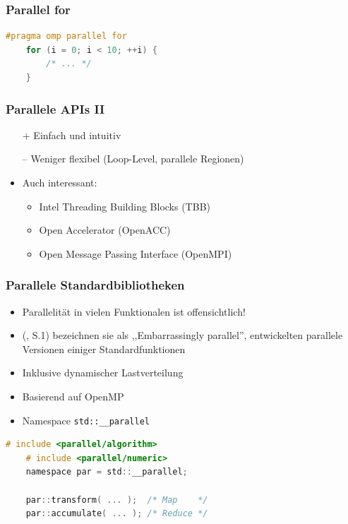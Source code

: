 \documentclass[presentation, shownotes]{beamer}
\begin{document}
\begin{frame}[fragile]
    \frametitle{Parallel for}
    \begin{lstlisting}[language=c,otherkeywords={pragma,for,parallel,omp}]
    #pragma omp parallel for
    for (i = 0; i < 10; ++i) {
        /* ... */
    }
    \end{lstlisting}
\end{frame}

\begin{frame}
\frametitle{Parallele APIs II}
    \begin{itemize}
        \item[+] Einfach und intuitiv
        \item[--] Weniger flexibel (Loop-Level, parallele Regionen)
        \bigskip
        \item Auch interessant:
            \begin{itemize}
            \item Intel Threading Building Blocks (TBB)
            \item Open Accelerator (OpenACC)
            \item Open Message Passing Interface (OpenMPI)
            \end{itemize}
    \end{itemize}
\end{frame}

\begin{frame}
\frametitle{Parallele Standardbibliotheken}
    \begin{itemize}
        \item Parallelität in vielen Funktionalen ist offensichtlich!
        \item \citeauthor{singler2007mcstl} (\citeyear{singler2007mcstl}, S.1) bezeichnen sie als ,,Embarrassingly parallel'', entwickelten parallele Versionen einiger Standardfunktionen
        \item Inklusive dynamischer Lastverteilung
        \item Basierend auf OpenMP
        \item Namespace \texttt{std::\_\_parallel}
    \end{itemize}
\end{frame}

\begin{frame}[fragile]
    \begin{lstlisting}[language=c]
    # include <parallel/algorithm>
    # include <parallel/numeric>
    namespace par = std::__parallel;

    par::transform( ... );  /* Map    */
    par::accumulate( ... ); /* Reduce */
    \end{lstlisting}
\end{frame}
\end{document}
